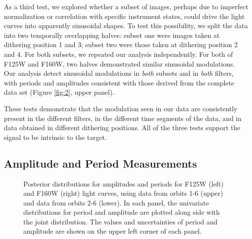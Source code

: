 \documentclass[apj]{emulateapj}
\newcommand{\revise}[1]{\textbf{{\color{cyan}{#1}}}}
\renewcommand{\revise}{}
\begin{document}
As a third test, we explored whether a subset of images, perhaps due to
imperfect normalization or correlation with specific instrument states,
could drive the light curves into apparently sinusoidal shapes. To
test this possibility, we split the data into two temporally
overlapping halves: subset one were images taken at dithering position
1 and 3; subset two were those taken at dithering position 2 and
4. For both subsets, we repeated our analysis independently.  For both
of F125W and F160W, two halves demonstrated similar sinusoidal
modulations.  Our analysis detect sinusoidal modulations in {\em both}
subsets and in {\em both} filters, with periods and amplitudes
consistent with those derived from the complete data set (Figure
\ref{fig:2}, upper panel).
 
 These tests demonstrate that the modulation seen in our data are
 consistently present in the different filters, in the different time
 segments of the data, and in data obtained in different dithering
 positions. All of the three tests support the signal to be
 intrinsic to the target. 
 

\subsection{Amplitude and Period Measurements}
\label{sec:MCMC}

\begin{figure}
  \centering
{}
  \caption{\revise{Posterior distributions for amplitudes and periods for F125W
    (left) and F160W (right) light curves, using data from orbits 1-6
    (upper) and data from orbits 2-6 (lower). In each panel,
    the univariate distributions for period and amplitude are plotted
    along side with the joint distribution. The values and
    uncertainties of period and amplitude are shown on the upper left
    corner of each panel.}}
  \label{fig:4}
\end{figure}
\end{document}
